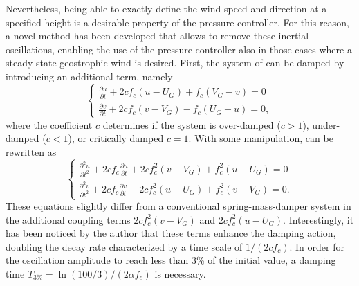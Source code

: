 Nevertheless, being able to exactly define the wind speed and direction at a specified height is a desirable property of the pressure controller. For this reason, a novel method has been developed that allows to remove these inertial oscillations, enabling the use of the pressure controller also in those cases where a steady state geostrophic wind is desired. First, the system of  can be damped by introducing an additional term, namely
\begin{equation}
	\begin{cases}
		\frac{\partial u}{\partial t} + 2c f_c(u-U_G) + f_c(V_G - v) = 0  \\
		\frac{\partial v}{\partial t} + 2c f_c(v-V_G) - f_c(U_G -u) = 0,
	\end{cases} 
	\label{eq:geoBalanceUnsteadyDamped_1}
\end{equation}
where the coefficient $c$ determines if the system is over-damped ($c > 1$), under-damped ($c < 1$), or critically damped $c = 1$. With some manipulation,  can be rewritten as
\begin{equation}
	\begin{cases}
		\frac{\partial^2 u}{\partial t^2} + 2c f_c \frac{\partial u}{\partial t} + 2c f_c^2(v-V_G) + f_c^2(u-U_G) = 0  \\
		\frac{\partial^2 v}{\partial t^2} + 2c f_c \frac{\partial v}{\partial t} - 2c f_c^2(u-U_G) + f_c^2(v-V_G) = 0.
	\end{cases} 
	\label{eq:geoBalanceUnsteadyDamped_2}
\end{equation}
These equations slightly differ from a conventional spring-mass-damper system in the additional coupling terms $2c f_c^2(v-V_G)$ and $2c f_c^2(u-U_G)$. Interestingly, it has been noticed by the author that these terms enhance the damping action, doubling the decay rate characterized by a time scale of $1/(2c f_c)$. In order for the oscillation amplitude to reach less than 3\% of the initial value, a damping time $T_{3\%}=\ln(100/3)/(2 \alpha f_c)$ is necessary. 

